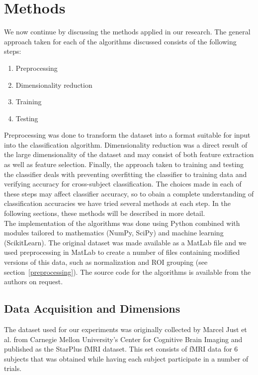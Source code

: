 \documentclass[preprint,journal,11pt]{vgtc}
\begin{document}
\section{Methods}
\label{sec:methods}
We now continue by discussing the methods applied in our research. The general approach taken for each of the algorithms discussed consists of the following steps:
\begin{enumerate}
  \item Preprocessing
  \item Dimensionality reduction
  \item Training
  \item Testing
\end{enumerate}
Preprocessing was done to transform the dataset into a format suitable for input into the classification algorithm. Dimensionality reduction was a direct result of the large dimensionality of the dataset and may consist of both feature extraction as well as feature selection. Finally, the approach taken to training and testing the classifier deals with preventing overfitting the classifier to training data and verifying accuracy for cross-subject classification. The choices made in each of these steps may affect classifier accuracy, so to obain a complete understanding of classification accuracies we have tried several methods at each step. In the following sections, these methods will be described in more detail.\\
The implementation of the algorithms was done using Python combined with modules tailored to mathematics (NumPy, SciPy) and machine learning (ScikitLearn). The original dataset was made available as a MatLab file and we used preprocessing in MatLab to create a number of files containing modified versions of this data, such as normalization and ROI grouping (see section~\ref{preprocessing}). The source code for the algorithms is available from the authors on request.

\subsection{Data Acquisition and Dimensions}
The dataset used for our experiments was originally collected by Marcel Just et al. from Carnegie Mellon University's Center for Cognitive Brain Imaging and published as the StarPlus fMRI dataset. This set consists of fMRI data for 6 subjects that was obtained while having each subject participate in a number of trials.
\end{document}
